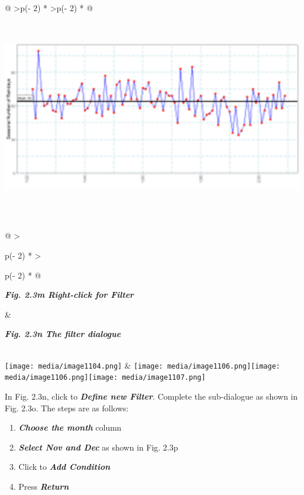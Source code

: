 \documentclass[
  letterpaper,
  DIV=11,
  numbers=noendperiod]{scrreprt}
\begin{document}
\begin{longtable}[]{@{}
  >{\centering\arraybackslash}p{(\columnwidth - 2\tabcolsep) * }
  >{\centering\arraybackslash}p{(\columnwidth - 2\tabcolsep) * }@{}}
\includegraphics[width=6.944in,height=3.659in]{figures/Fig2.3l.png} \\
\end{longtable}

\begin{longtable}[]{@{}
  >{\raggedright\arraybackslash}p{(\columnwidth - 2\tabcolsep) * }
  >{\raggedright\arraybackslash}p{(\columnwidth - 2\tabcolsep) * }@{}}
\toprule\noalign{}
\begin{minipage}[b]{\linewidth}\raggedright
\textbf{\emph{Fig. 2.3m Right-click for Filter}}
\end{minipage} & \begin{minipage}[b]{\linewidth}\raggedright
\textbf{\emph{Fig. 2.3n The filter dialogue}}
\end{minipage} \\
\midrule\noalign{}
\endhead
\bottomrule\noalign{}
\endlastfoot
\texttt{[image: media/image1104.png]}
&
\texttt{[image: media/image1106.png]}\texttt{[image: media/image1106.png]}\texttt{[image: media/image1107.png]} \\
\end{longtable}

In Fig. 2.3n, click to \textbf{\emph{Define new Filter}}. Complete the
sub-dialogue as shown in Fig. 2.3o. The steps are as follows:

\begin{enumerate}
\def\labelenumi{\arabic{enumi})}
\item
  \textbf{\emph{Choose the month}} column
\item
  \textbf{\emph{Select Nov and Dec}} as shown in Fig. 2.3p
\item
  Click to \textbf{\emph{Add Condition}}
\item
  Press \textbf{\emph{Return}}
\end{enumerate}
\end{document}
